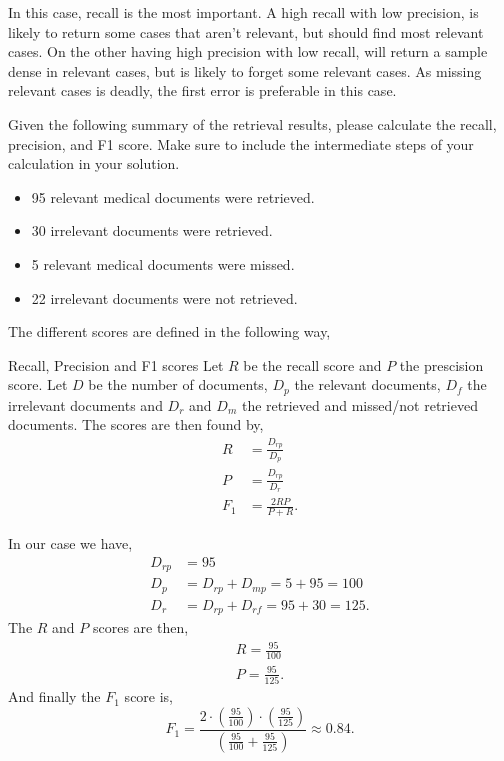 \documentclass[working, oneside]{../../Preambles/tuftebook}
\begin{document}
In this case, recall is the most important. A high recall with low precision, is likely to return some cases that aren't relevant, but should find most relevant cases. On the other having high precision with low recall, will return a sample dense in relevant cases, but is likely to forget some relevant cases. As missing relevant cases is deadly, the first error is preferable in this case.
\begin{subexercise}{}
Given the following summary of the retrieval results, please calculate the
recall, precision, and F1 score. Make sure to include the intermediate steps
of your calculation in your solution.
\begin{itemize}
    \item 95 relevant medical documents were retrieved.
    \item 30 irrelevant documents were retrieved.
    \item 5 relevant medical documents were missed.
    \item 22 irrelevant documents were not retrieved.
\end{itemize}
\end{subexercise}
The different scores are defined in the following way,
\begin{SimpleBox}{Recall, Precision and F1 scores}
    Let $R$ be the recall score and $P$ the prescision score. Let $D$ be the number of documents,  $D_p$ the relevant documents, $D_f$ the irrelevant documents and  $D_r$ and $D_m$ the retrieved and missed/not retrieved documents. The scores are then found by,
     \begin{align*}
         R& = \frac{D_{rp}}{D_p} \\
        P &= \frac{D_{rp}}{D_r} \\
        F_1 &= \frac{2RP}{P + R}
    .\end{align*}
\end{SimpleBox}
In our case we have, 
\begin{align*}
    D_{rp} &= 95 \\
    D_p &= D_{rp} + D_{mp} = 5 + 95 = 100 \\
    D_r &= D_{rp} + D_{rf} = 95 + 30 = 125
.\end{align*}
The $R$ and $P$ scores are then,
\begin{align*}
R = \frac{95}{100} \\
P = \frac{95}{125} 
.\end{align*}
And finally the $F_1$ score is,
\[
    F_1 = \frac{2 \cdot \left( \frac{95}{100} \right) \cdot \left( \frac{95}{125} \right) }{\left( \frac{95}{100} + \frac{95}{125} \right) } \approx 0.84
.\] 
\end{document}
